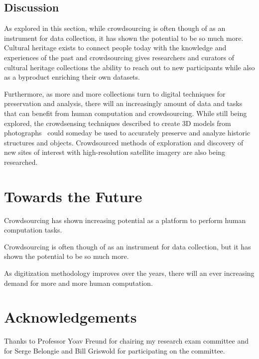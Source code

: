\documentclass[10pt,twocolumn]{article}
\begin{document}
\subsection{Discussion}
As explored in this section, while crowdsourcing is often though of as an 
instrument for data collection, it has shown the potential to be so much more. 
Cultural heritage exists to connect people today with the knowledge and 
experiences of the past and crowdsourcing gives researchers and curators of 
cultural heritage collections the ability to reach out to new participants while 
also as a byproduct enriching their own datasets.

Furthermore, as more and more collections turn to digital techniques for 
preservation and analysis, there will an increasingly amount of data and tasks 
that can benefit from human computation and crowdsourcing. While still being 
explored, the crowdsensing techniques described to create 3D models from 
photographs~\cite{Agarwal2009} could someday be used to accurately preserve 
and analyze historic structures and objects. Crowdsourced methods of exploration 
and discovery of new sites of interest with high-resolution satellite imagery
are also being researched.


\section{Towards the Future}

Crowdsourcing has shown increasing potential as a platform to perform
human computation tasks. 

Crowdsourcing is often though of as an instrument for data collection, but it has shown the potential to be so much more.

As digitization methodology improves over the years, there will an 
ever increasing demand for more and more human computation.

\section{Acknowledgements}
Thanks to Professor Yoav Freund for chairing my research exam committee and 
for Serge Belongie and Bill Griswold for participating on the committee.



\end{document}
